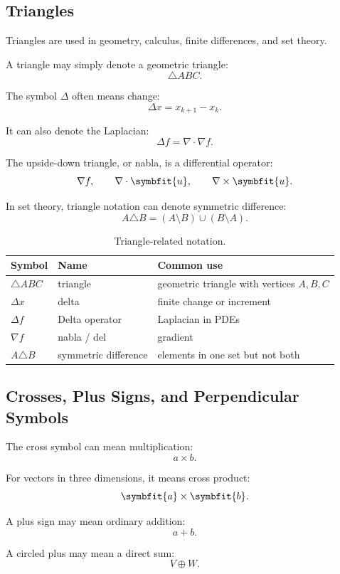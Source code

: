\documentclass[11pt,twocolumn]{article}
\newcommand{\vct}[1]{\symbfit{#1}}   %
\begin{document}
\subsection{Triangles}

Triangles are used in geometry, calculus, finite differences, and set theory.

A triangle may simply denote a geometric triangle:
\[
\triangle ABC.
\]

The symbol \(\Delta\) often means change:
\[
\Delta x = x_{k+1}-x_k.
\]

It can also denote the Laplacian:
\[
\Delta f
=
\nabla\cdot\nabla f.
\]

The upside-down triangle, or nabla, is a differential operator:
\[
\nabla f,
\qquad
\nabla\cdot\vct{u},
\qquad
\nabla\times\vct{u}.
\]

In set theory, triangle notation can denote symmetric difference:
\[
A \triangle B
=
(A\setminus B)\cup(B\setminus A).
\]

\begin{table}[ht]
\centering
\small
\caption{Triangle-related notation.}
\begin{tabular}{lll}
\toprule
Symbol & Name & Common use \\
\midrule
$\triangle ABC$ & triangle & geometric triangle with vertices \(A,B,C\) \\
$\Delta x$ & delta & finite change or increment \\
$\Delta f$ & Delta operator & Laplacian in PDEs \\
$\nabla f$ & nabla / del & gradient \\
$A\triangle B$ & symmetric difference & elements in one set but not both \\
\bottomrule
\end{tabular}
\end{table}

\subsection{Crosses, Plus Signs, and Perpendicular Symbols}

The cross symbol can mean multiplication:
\[
a\times b.
\]

For vectors in three dimensions, it means cross product:
\[
\vct{a}\times\vct{b}.
\]

A plus sign may mean ordinary addition:
\[
a+b.
\]

A circled plus may mean a direct sum:
\[
V \oplus W.
\]
\end{document}
